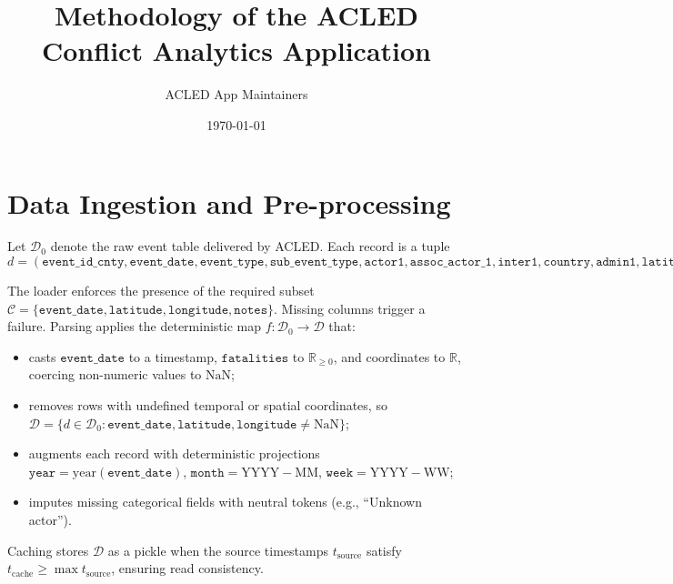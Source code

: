 \documentclass[11pt]{article}
\title{Methodology of the ACLED Conflict Analytics Application}
\author{ACLED App Maintainers}
\date{\today}
\begin{document}
\maketitle
\tableofcontents
\bigskip

\section{Data Ingestion and Pre-processing}
Let $\mathcal{D}_0$ denote the raw event table delivered by ACLED. Each record is a tuple
\[ d = (\texttt{event\_id\_cnty}, \texttt{event\_date}, \texttt{event\_type}, \texttt{sub\_event\_type}, \texttt{actor1}, \texttt{assoc\_actor\_1}, \texttt{inter1}, \texttt{country}, \texttt{admin1}, \texttt{latitude}, \texttt{longitude}, \texttt{notes}, \texttt{fatalities}) . \]

The loader enforces the presence of the required subset $\mathcal{C} = \{\texttt{event\_date}, \texttt{latitude}, \texttt{longitude}, \texttt{notes}\}$. Missing columns trigger a failure. Parsing applies the deterministic map $f:\mathcal{D}_0 \to \mathcal{D}$ that:
\begin{itemize}
  \item casts $\texttt{event\_date}$ to a timestamp, $\texttt{fatalities}$ to $\mathbb{R}_{\ge 0}$, and coordinates to $\mathbb{R}$, coercing non-numeric values to $\mathrm{NaN}$;
  \item removes rows with undefined temporal or spatial coordinates, so $\mathcal{D} = \{d \in \mathcal{D}_0 : \texttt{event\_date}, \texttt{latitude}, \texttt{longitude} \neq \mathrm{NaN}\}$;
  \item augments each record with deterministic projections $\texttt{year} = \mathrm{year}(\texttt{event\_date})$, $\texttt{month} = \mathrm{YYYY{-}MM}$, $\texttt{week} = \mathrm{YYYY{-}WW}$;
  \item imputes missing categorical fields with neutral tokens (e.g., ``Unknown actor'').
\end{itemize}

Caching stores $\mathcal{D}$ as a pickle when the source timestamps $t_{\text{source}}$ satisfy $t_{\text{cache}} \ge \max t_{\text{source}}$, ensuring read consistency.
\end{document}
